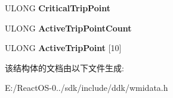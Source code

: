 \begin{DoxyCompactItemize}
\item 
\mbox{\label{struct___m_s_acpi___thermal_zone_temperature_adcdfb98f240d475349bb6bb8f75a6bad}} 
U\+L\+O\+NG {\bfseries Critical\+Trip\+Point}
\item 
\mbox{\label{struct___m_s_acpi___thermal_zone_temperature_a3cfdaaaafc0d81278e85669124428feb}} 
U\+L\+O\+NG {\bfseries Active\+Trip\+Point\+Count}
\item 
\mbox{\label{struct___m_s_acpi___thermal_zone_temperature_a38233ee206ab6ede8d245c8f3c88806d}} 
U\+L\+O\+NG {\bfseries Active\+Trip\+Point} \mbox{[}10\mbox{]}
\end{DoxyCompactItemize}


该结构体的文档由以下文件生成\+:\begin{DoxyCompactItemize}
\item 
E\+:/\+React\+O\+S-\/0../sdk/include/ddk/wmidata.\+h\end{DoxyCompactItemize}

